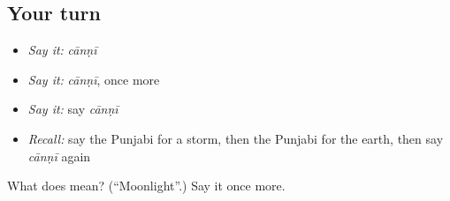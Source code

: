 \subsection*{Your turn}
\begin{itemize}
\raggedright
  \item \emph{Say it:} \emph{cānṇī}
  \item \emph{Say it:} \emph{cānṇī}, once more
  \item \emph{Say it:} say \emph{cānṇī}
  \item \emph{Recall:} say the Punjabi for a storm, then the Punjabi for the earth, then say \emph{cānṇī} again
\end{itemize}

\begin{tcolorbox}[breakable,colback=teal!4,colframe=teal!35!black,title={Before you move on}]
What does  mean? (\textquotedblleft{}Moonlight\textquotedblright{}.) Say it once more.
\end{tcolorbox}
